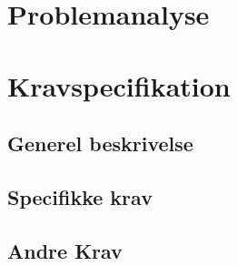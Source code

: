 
 





\frontmatter

\newpage
\tableofcontents
\mainmatter






\chapter{Problemanalyse}
\label{cha:problemanalyse}



\chapter{Kravspecifikation}
\label{cha:kravspecifikation}
\begin{indledning}

\end{indledning}

\section{Generel beskrivelse}









\section{Specifikke krav}
\label{sec:speckrav}








%

\section{Andre Krav}
\label{sec:andre-krav}

